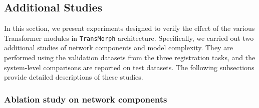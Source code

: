\documentclass[times,twocolumn,final]{elsarticle}
\begin{document}
\subsection{Additional Studies}
In this section, we present experiments designed to verify the effect of the various Transformer modules in \texttt{TransMorph} architecture. Specifically, we carried out two additional studies of network components and model complexity. They are performed using the validation datasets from the three registration tasks, and the system-level comparisons are reported on test datasets. The following subsections provide detailed descriptions of these studies.

\subsubsection{Ablation study on network components}
\end{document}
